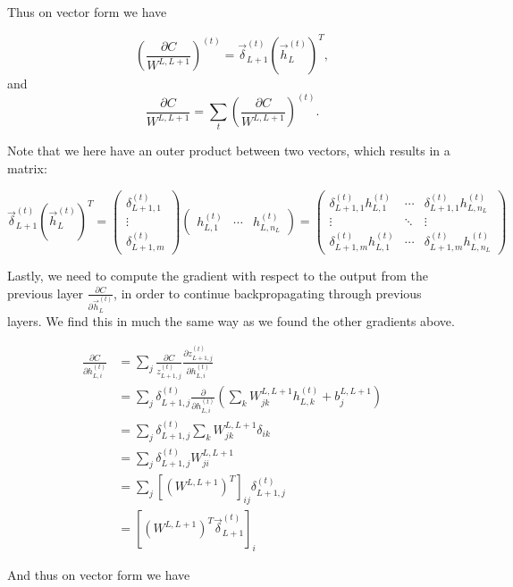 \documentclass[11pt]{article}
\begin{document}
Thus on vector form we have

\[ \left( \frac{\partial C}{W^{L,L+1}} \right)^{(t)} = \vec{\delta}_{L+1}^{(t)} \left(\vec{h}_{L}^{(t)}\right)^T, \]
and
\[\frac{\partial C}{W^{L,L+1}} = \sum_t \left( \frac{\partial C}{W^{L,L+1}} \right)^{(t)}.\]

    Note that we here have an outer product between two vectors, which
results in a matrix:

\[
\vec{\delta}_{L+1}^{(t)} \left(\vec{h}_{L}^{(t)}\right)^T
=
\begin{pmatrix}
\delta_{L+1,1}^{(t)} \\ \vdots \\ \delta_{L+1,m}^{(t)}
\end{pmatrix}
\begin{pmatrix}
h_{L,1}^{(t)} & \cdots & h_{L,n_L}^{(t)}
\end{pmatrix}
=
\begin{pmatrix}
\delta_{L+1,1}^{(t)} h_{L,1}^{(t)} & \cdots & \delta_{L+1,1}^{(t)} h_{L,n_L}^{(t)}
\\
\vdots & \ddots & \vdots
\\
\delta_{L+1,m}^{(t)} h_{L,1}^{(t)} & \cdots & \delta_{L+1,m}^{(t)} h_{L,n_L}^{(t)}
\end{pmatrix}
\]

    Lastly, we need to compute the gradient with respect to the output from
the previous layer \(\frac{\partial C}{\partial \vec{h}_L^{(t)}}\), in
order to continue backpropagating through previous layers. We find this
in much the same way as we found the other gradients above.

\begin{align*}
\frac{\partial C}{\partial h_{L,i}^{(t)}} &= \sum_j \frac{\partial C}{z_{L+1,j}^{(t)}} \frac{\partial z_{L+1,j}^{(t)}}{\partial h_{L,i}^{(t)}}
\\[4ex]
&= \sum_j \delta_{L+1,j}^{(t)} \frac{\partial}{\partial h_{L,i}^{(t)}} \left( \sum_k W^{L,L+1}_{jk} h_{L,k}^{(t)} + b_j^{L,L+1} \right)
\\[4ex]
&= \sum_j \delta_{L+1,j}^{(t)} \sum_k W^{L,L+1}_{jk} \delta_{ik}
\\[4ex]
&= \sum_j \delta_{L+1,j}^{(t)} W^{L,L+1}_{ji}
\\[4ex]
&= \sum_j \left[ \left( W^{L,L+1} \right)^T \right]_{ij} \delta_{L+1,j}^{(t)}
\\[4ex]
&= \left[ \left(W^{L,L+1} \right)^T \vec{\delta}_{L+1}^{(t)} \right]_i
\end{align*}

And thus on vector form we have
\end{document}
